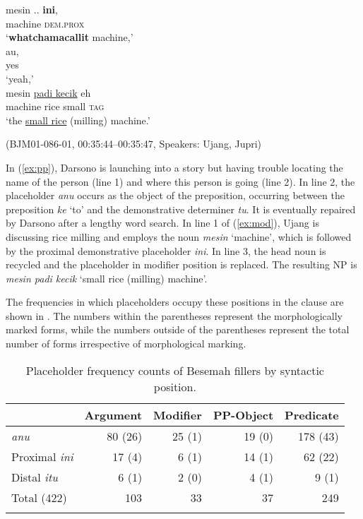 \documentclass[output=paper,
\ChapterDOI{10.5281/zenodo.15697583}
colorlinks,
citecolor=brown]{langscibook}
\begin{document}
\begin{exe}
    \ex\label{ex:mod} \begin{xlist}[0\quad →A:]
        \gll mesin {..} \textbf{ini},\\
        machine {} \textsc{dem.prox}\\
        \glt `\textbf{whatchamacallit} machine,' \\
         au,\\
        {} yes\\
        \glt  `yeah,' \\
        \gll mesin \uline{padi kecik} eh\\
       machine {rice\hphantom{i} small} \textsc{tag}\\
        \glt `the \uline{small rice} (milling) machine.' \\
    \end{xlist}
    \hfill (BJM01-086-01, 00:35:44–00:35:47, Speakers: Ujang, Jupri) 
\end{exe}

In (\ref{ex:pp}), Darsono is launching into a story but having trouble locating the name of the person (line 1) and where this person is going (line 2). In line 2, the placeholder \textit{anu} occurs as the object of the preposition, occurring between the preposition \textit{ke} `to' and the demonstrative determiner \textit{tu}. It is eventually repaired by Darsono after a lengthy word search. In line 1 of (\ref{ex:mod}), Ujang is discussing rice milling and employs the noun \textit{mesin} `machine', which is followed by the proximal demonstrative placeholder \textit{ini}. In line 3, the head noun is recycled and the placeholder in modifier position is replaced. The resulting NP is \textit{mesin padi kecik} `small rice (milling) machine'.


The frequencies in which placeholders occupy these positions in the clause are shown in . The numbers within the parentheses represent the morphologically marked forms, while the numbers outside of the parentheses represent the total number of forms irrespective of morphological marking.

\begin{table}
    \caption{Placeholder frequency counts of Besemah fillers by syntactic position.}
    \label{table:place-rep-rep}
    \begin{tabularx}{0.8\textwidth}{X@{}rrrr}
        \lsptoprule
        & Argument & Modifier & PP-Object & Predicate \\
        \midrule
        \textit{anu} & 80 (26) & 25 (1) & 19 (0) & 178 (43) \\ 
        Proximal \textit{ini} & 17 (4) & 6 (1) & 14 (1) & 62 (22) \\
        Distal \textit{itu} & 6 (1) & 2 (0) & 4 (1) & 9 (1) \\
        \midrule
        Total (422) & 103 & 33 & 37 & 249 \\
        \lspbottomrule
    \end{tabularx}
\end{table}
\end{document}
